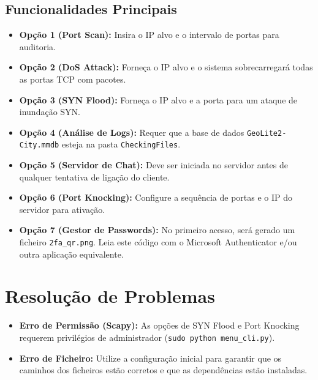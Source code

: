 \documentclass[12pt,a4paper]{article}
\begin{document}
\subsection{Funcionalidades Principais}
\begin{itemize}
    \item \textbf{Opção 1 (Port Scan):} Insira o IP alvo e o intervalo de portas para auditoria.
    \item \textbf{Opção 2 (DoS Attack):} Forneça o IP alvo e o sistema sobrecarregará todas as portas TCP com pacotes.
    \item \textbf{Opção 3 (SYN Flood):} Forneça o IP alvo e a porta para um ataque de inundação SYN. 
    \item \textbf{Opção 4 (Análise de Logs):} Requer que a base de dados \texttt{GeoLite2-City.mmdb} esteja na pasta \texttt{CheckingFiles}.
    \item \textbf{Opção 5 (Servidor de Chat):} Deve ser iniciada no servidor antes de qualquer tentativa de ligação do cliente.
    \item \textbf{Opção 6 (Port Knocking):} Configure a sequência de portas e o IP do servidor para ativação.
    \item \textbf{Opção 7 (Gestor de Passwords):} No primeiro acesso, será gerado um ficheiro \texttt{2fa\_qr.png}. Leia este código com o Microsoft Authenticator 
    e/ou outra aplicação equivalente.
\end{itemize}

\section{Resolução de Problemas}
\begin{itemize}
    \item \textbf{Erro de Permissão (Scapy):} As opções de SYN Flood e Port Knocking requerem privilégios de administrador (\texttt{sudo python menu\_cli.py}).
    \item \textbf{Erro de Ficheiro:} Utilize a configuração inicial para garantir que os caminhos dos ficheiros estão corretos e que as dependências 
    estão instaladas.
\end{itemize}
\end{document}
